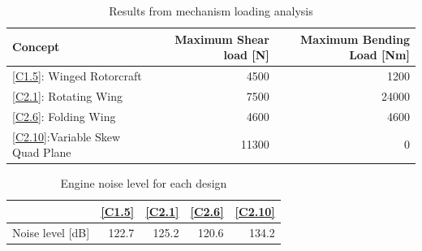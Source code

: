 \begin{table}[h]
    \centering
    \caption{Results from mechanism loading analysis}
    \label{tab:over_load}
    \begin{tabular}{l|r|r}
        \toprule
        Concept                       & Maximum Shear load {[}N{]} & Maximum Bending Load {[}Nm{]} \\ \midrule
        \ref{C1.5}: Winged Rotorcraft       & 4500                       & 1200                          \\
        \ref{C2.1}: Rotating Wing           & 7500                       & 24000                         \\
        \ref{C2.6}: Folding Wing            & 4600                       & 4600                          \\
        \ref{C2.10}:Variable Skew Quad Plane & 11300                      & 0                             \\ \bottomrule
    \end{tabular}
    
\end{table}

\begin{table}[h]
\centering
\caption{Engine noise level for each design}
\label{tab:over_noise}
\begin{tabular}{c|r|r|r|r}
\toprule
       & \ref{C1.5}  & \ref{C2.1}  & \ref{C2.6}  & \ref{C2.10} \\ \midrule
Noise level {[}dB{]} & 122.7 & 125.2 & 120.6 & 134.2 \\ \bottomrule
\end{tabular}

\end{table}

